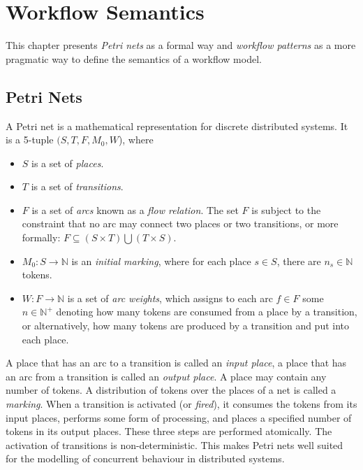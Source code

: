 \chapter{Workflow Semantics}
\label{chapter-WorkflowSemantics}

This chapter presents \emph{Petri nets} as a formal way and
\emph{workflow patterns} as a more pragmatic way to define the semantics of a
workflow model.

\section{Petri Nets}

A Petri net is a mathematical representation for discrete distributed systems.
It is a 5-tuple $(S, T, F, M_0, W$), where \cite{JD01}

\begin{itemize}
\item $S$ is a set of \emph{places}.
\item $T$ is a set of \emph{transitions}.
\item $F$ is a set of \emph{arcs} known as a \emph{flow relation}. The set
      $F$ is subject to the constraint that no arc may connect two places
      or two transitions, or more formally:
      $F \subseteq (S \times T) \bigcup (T \times S)$.
\item $M_0 : S \rightarrow \mathbb{N}$ is an \emph{initial marking}, where
      for each place $s \in S$, there are $n_s \in \mathbb{N}$ tokens.
\item $W : F \rightarrow \mathbb{N}$ is a set of \emph{arc weights}, which
      assigns to each arc $f \in F$ some $n \in \mathbb{N}^+$ denoting how
      many tokens are consumed from a place by a transition, or alternatively,
      how many tokens are produced by a transition and put into each place.
\end{itemize}

A place that has an arc to a transition is called an \emph{input place}, a
place that has an arc from a transition is called an \emph{output place}. A
place may contain any number of tokens. A distribution of tokens over the
places of a net is called a \emph{marking}. When a transition is activated
(or \emph{fired}), it consumes the tokens from its input places, performs
some form of processing, and places a specified number of tokens in its
output places. These three steps are performed atomically. The activation
of transitions is non-deterministic. This makes Petri nets well suited for
the modelling of concurrent behaviour in distributed systems.

